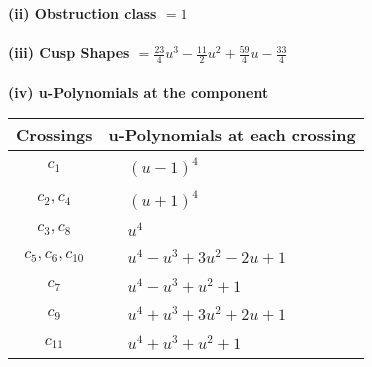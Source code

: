 \documentclass[1p]{elsarticle_modified}
\theoremstyle{definition}
\begin{document}
\flushleft \textbf{(ii) Obstruction class $= 1$}\\~\\
\flushleft \textbf{(iii) Cusp Shapes $= \frac{23}{4} u^3-\frac{11}{2} u^2+\frac{59}{4} u-\frac{33}{4}$}\\~\\
\newpage\renewcommand{\arraystretch}{1}
\flushleft \textbf{(iv) u-Polynomials at the component}\newline \\
\begin{tabular}{m{50pt}|m{274pt}}
Crossings & \hspace{64pt}u-Polynomials at each crossing \\
\hline $$\begin{aligned}c_{1}\end{aligned}$$&$\begin{aligned}
&(u-1)^4
\end{aligned}$\\
\hline $$\begin{aligned}c_{2},c_{4}\end{aligned}$$&$\begin{aligned}
&(u+1)^4
\end{aligned}$\\
\hline $$\begin{aligned}c_{3},c_{8}\end{aligned}$$&$\begin{aligned}
&u^4
\end{aligned}$\\
\hline $$\begin{aligned}c_{5},c_{6},c_{10}\end{aligned}$$&$\begin{aligned}
&u^4- u^3+3 u^2-2 u+1
\end{aligned}$\\
\hline $$\begin{aligned}c_{7}\end{aligned}$$&$\begin{aligned}
&u^4- u^3+u^2+1
\end{aligned}$\\
\hline $$\begin{aligned}c_{9}\end{aligned}$$&$\begin{aligned}
&u^4+u^3+3 u^2+2 u+1
\end{aligned}$\\
\hline $$\begin{aligned}c_{11}\end{aligned}$$&$\begin{aligned}
&u^4+u^3+u^2+1
\end{aligned}$\\
\hline
\end{tabular}\\~\\
\end{document}
